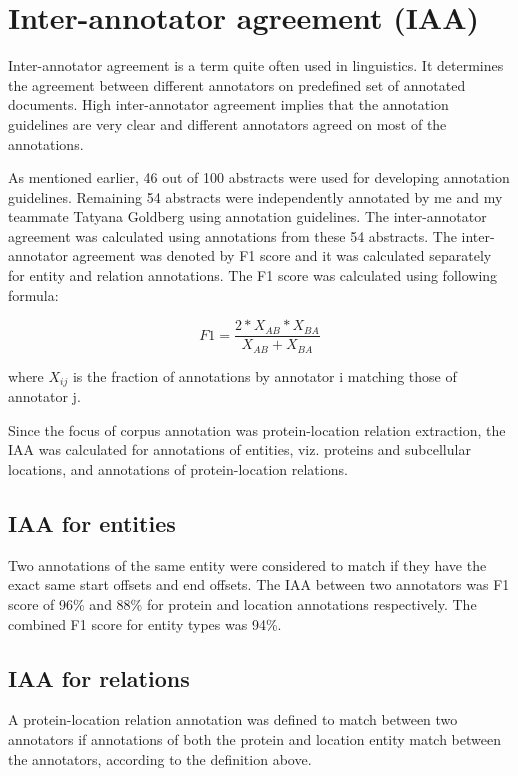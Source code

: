 \section{Inter-annotator agreement (IAA)}

Inter-annotator agreement is a term quite often used in linguistics. It determines the agreement between different annotators on predefined set of annotated documents. High inter-annotator agreement implies that the annotation guidelines are very clear and different annotators agreed on most of the annotations.

As mentioned earlier, 46 out of 100 abstracts were used for developing annotation guidelines. Remaining 54 abstracts were independently annotated by me and my teammate Tatyana Goldberg using annotation guidelines. The inter-annotator agreement was calculated using annotations from these 54 abstracts. The inter-annotator agreement was denoted by F1 score and it was calculated separately for entity and relation annotations. The F1 score was calculated using following formula:

$$
F1 = \frac{2*X_{AB}*X_{BA}}{X_{AB}+X_{BA}}
$$

where $X_{ij}$ is the fraction of annotations by annotator i matching those of annotator j.

Since the focus of corpus annotation was protein-location relation extraction, the IAA was calculated for annotations of entities, viz. proteins and subcellular locations, and annotations of protein-location relations.

\subsection*{IAA for entities}

Two annotations of the same entity were considered to match if they have the exact same start offsets and end offsets. The IAA between two annotators was F1 score of  96\% and 88\% for protein and location annotations respectively. The combined F1 score for entity types was 94\%.

\subsection*{IAA for relations}

A protein-location relation annotation was defined to match between two annotators if annotations of both the protein and location entity match between the annotators, according to the definition above.

